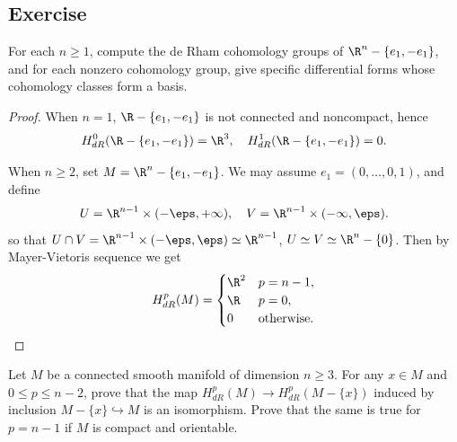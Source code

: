 \subsection{Exercise}
\begin{exercise}
For each $n\geq1$, compute the de Rham cohomology groups of $\R^n-\{e_1,-e_1\}$, and for each nonzero cohomology group, give specific differential forms whose cohomology classes form a basis.
\end{exercise}
\begin{proof}
When $n=1$, $\R-\{e_1,-e_1\}$ is not connected and noncompact, hence 
\[H^0_{dR}(\R-\{e_1,-e_1\})=\R^3,\quad H^1_{dR}(\R-\{e_1,-e_1\})=0.\]

When $n\geq 2$, set $M=\R^n-\{e_1,-e_1\}$. We may assume $e_1=(0,\dots,0,1)$, and define
\[U=\R^{n-1}\times(-\eps,+\infty),\quad V=\R^{n-1}\times(-\infty,\eps).\]
so that $U\cap V=\R^{n-1}\times(-\eps,\eps)\simeq\R^{n-1}$, $U\simeq V\simeq\R^n-\{0\}$. Then by Mayer-Vietoris sequence we get
\[H^p_{dR}(M)=\begin{cases}
\R^2&p=n-1,\\
\R&p=0,\\
0&\text{otherwise}.
\end{cases}\]
\end{proof}
\begin{exercise}
Let $M$ be a connected smooth manifold of dimension $n\geq3$. For any $x\in M$ and $0\leq p\leq n-2$, prove that the map $H^p_{dR}(M)\to H^p_{dR}(M-\{x\})$ induced by inclusion $M-\{x\}\hookrightarrow M$ is an isomorphism. Prove that the same is true for $p=n-1$ if $M$ is compact and orientable.
\end{exercise}
